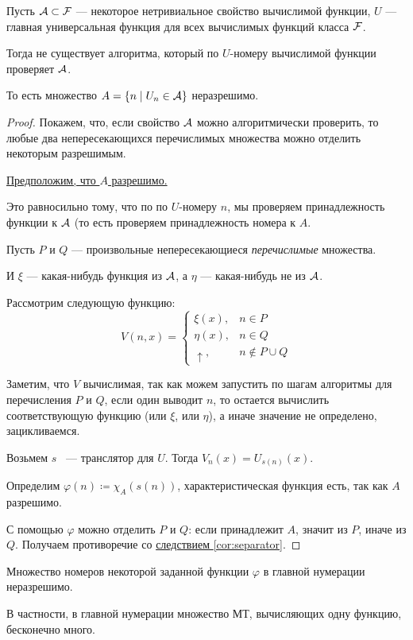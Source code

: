 \begin{thm}
	Пусть $ \mathcal{A} \subset \mathcal{F}$ --- некоторое нетривиальное свойство вычислимой функции, 
	$ U$ --- главная универсальная функция для всех вычислимых функций класса $ \mathcal{F}$.

	Тогда не существует алгоритма, который по  $ U$-номеру вычислимой функции проверяет $ \mathcal{A}$. 

	То есть множество $ A = \{n \mid U_n \in \mathcal{A}\}$ неразрешимо.
\end{thm}
\begin{proof}
    Покажем, что, если свойство $ \mathcal{A}$ можно алгоритмически проверить, то любые два непересекающихся перечислимых множества можно отделить некоторым разрешимым.
    
    \underline{Предположим, что $A$ разрешимо.}
    
    Это равносильно тому, что по по $U$-номеру $n$, мы проверяем принадлежность функции к $\mathcal{A}$ (то есть проверяем принадлежность номера к $A$.

	Пусть $ P$ и $ Q$ --- произвольные непересекающиеся \textit{перечислимые} множества. 

	И $ \xi$ --- какая-нибудь функция из $ \mathcal{A}$, а $ \eta$ --- какая-нибудь не из $ \mathcal{A}$.

	Рассмотрим следующую функцию:
	\[
		V(n, x) = 
		\begin{cases}
			\xi(x), & n \in P \\
			\eta(x), & n \in Q\\
			\uparrow, & n \notin P \cup Q
		\end{cases}
	\] 

	Заметим, что $ V$ вычислимая, так как можем запустить по шагам алгоритмы для перечисления $ P$ и $ Q$, если один выводит $n$, то остается вычислить соответствующую функцию (или $\xi$, или $\eta$), а иначе значение не определено, зацикливаемся.
	
	Возьмем $s$ ~--- транслятор для $U$. Тогда $V_n(x) = U_{s(n)}(x)$. 

	Определим $\varphi(n) \coloneqq \chi_A(s(n))$, характеристическая функция есть, так как $A$ разрешимо.

	С помощью $\varphi$ можно отделить $P$ и $Q$: если принадлежит $A$, значит из $P$, иначе из $Q$. Получаем противоречие со \hyperref[cor:separator]{следствием \ref{cor:separator}}.
\end{proof}

\begin{cor}\label{cor:4}
    Множество номеров некоторой заданной функции $ \varphi $ в главной нумерации неразрешимо.

	В частности, в главной нумерации множество МТ, вычисляющих одну функцию, бесконечно много.
\end{cor}

